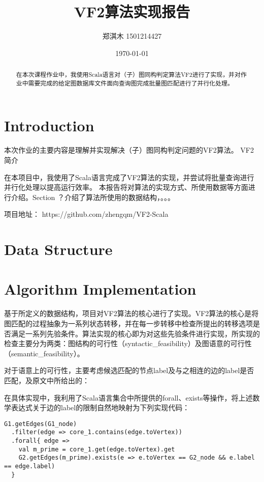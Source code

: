 \documentclass{article}
\title{VF2算法实现报告}
\author{郑淇木  1501214427}
\date{\today}
\begin{document}
\maketitle

\begin{abstract}
在本次课程作业中，我使用Scala语言对（子）图同构判定算法VF2进行了实现，并对作业中需要完成的给定图数据库文件面向查询图完成批量图匹配进行了并行化处理。

\end{abstract}


\section{Introduction}
本次作业的主要内容是理解并实现解决（子）图同构判定问题的VF2算法\cite{vf2}。
VF2简介

在本项目中，我使用了Scala语言完成了VF2算法的实现，并尝试将批量查询进行并行化处理以提高运行效率。
本报告将对算法的实现方式、所使用数据等方面进行介绍。Section ？介绍了算法所使用的数据结构，。。。

项目地址： https://github.com/zhengqm/VF2-Scala

\section{Data Structure}

\section{Algorithm Implementation}

基于所定义的数据结构，项目对VF2算法的核心进行了实现。VF2算法的核心是将图匹配的过程抽象为一系列状态转移，并在每一步转移中检查所提出的转移选项是否满足一系列先验条件。算法实现的核心即为对这些先验条件进行实现，所实现的检查主要分为两类：图结构的可行性（syntactic_feasibility）及图语意的可行性（semantic_feasibility）。

对于语意上的可行性，主要考虑候选匹配的节点label及与之相连的边的label是否匹配，及原文中所给出的：

在具体实现中，我利用了Scala语言集合中所提供的forall、exists等操作，将上述数学表达式关于边的label的限制自然地映射为下列实现代码：
\begin{lstlisting}[style=mStyle]
G1.getEdges(G1_node)
  .filter(edge => core_1.contains(edge.toVertex))
  .forall{ edge =>
    val m_prime = core_1.get(edge.toVertex).get
    G2.getEdges(m_prime).exists(e => e.toVertex == G2_node && e.label == edge.label)
  }
\end{lstlisting}
\end{document}

